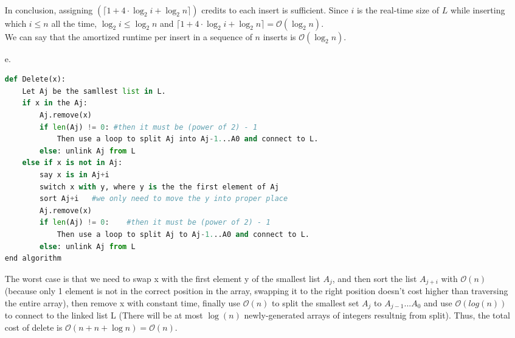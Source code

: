 \documentclass[10pt]{article}
\begin{document}
\begin{itemize}
\\
In conclusion, assigning $(\lceil 1+4\cdot\log_2i+\log_2n\rceil)$ credits to each insert is sufficient. Since $i$ is the real-time size of $L$ while inserting which $i\leq n$ all the time, $\log_2i\leq\log_2n$ and $\lceil 1+4\cdot\log_2i+\log_2n\rceil = \mathcal{O}(\log_2n)$. \\
We can say that the amortized runtime per insert in a sequence of $n$ inserts is $\mathcal{O}(\log_2n)$.
\item[e.]
\begin{lstlisting}[language=Python]
def Delete(x):
	Let Aj be the samllest list in L.
	if x in the Aj:
		Aj.remove(x)
		if len(Aj) != 0: #then it must be (power of 2) - 1
			Then use a loop to split Aj into Aj-1...A0 and connect to L.
		else: unlink Aj from L
	else if x is not in Aj:
		say x is in Aj+i
		switch x with y, where y is the the first element of Aj
		sort Aj+i   #we only need to move the y into proper place
		Aj.remove(x)
		if len(Aj) != 0: 	#then it must be (power of 2) - 1
			Then use a loop to split Aj to Aj-1...A0 and connect to L.
		else: unlink Aj from L
end algorithm
\end{lstlisting}
The worst case is that we need to swap x with the first element y of the smallest list $A_j$, and then sort the list $A_{j+i}$ with $\mathcal{O}(n)$ (because only 1 element is not in the correct position in the array, swapping it to the right position doesn't cost higher than traversing the entire array), then remove x with constant time, finally use $\mathcal{O}(n)$ to split the smallest set  $A_j$ to $A_{j-1} ... A_0$ and use $\mathcal{O}(log(n))$ to connect to the linked list L (There will be at most $\log(n)$ newly-generated arrays of integers resultnig from split). Thus, the total cost of delete is $\mathcal{O}(n+n+\log n) = \mathcal{O}(n)$.
\end{itemize}
\end{document}

